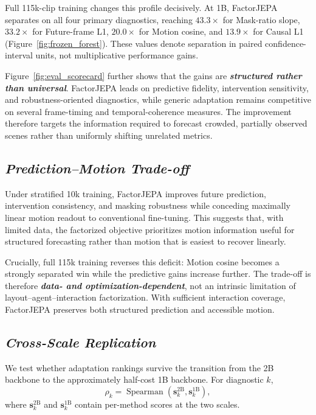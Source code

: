 Full 115k-clip training changes this profile decisively. At 1B, FactorJEPA
separates on all four primary diagnostics, reaching
\textbf{\emph{$43.3\times$}} for Mask-ratio slope,
\textbf{\emph{$33.2\times$}} for Future-frame L1,
\textbf{\emph{$20.0\times$}} for Motion cosine, and
\textbf{\emph{$13.9\times$}} for Causal L1
(Figure~\ref{fig:frozen_forest}). These values denote separation in paired
confidence-interval units, not multiplicative performance gains.

Figure~\ref{fig:eval_scorecard} further shows that the gains are
\textbf{\emph{structured rather than universal}}. FactorJEPA leads on
predictive fidelity, intervention sensitivity, and robustness-oriented
diagnostics, while generic adaptation remains competitive on several
frame-timing and temporal-coherence measures. The improvement therefore targets
the information required to forecast crowded, partially observed scenes rather
than uniformly shifting unrelated metrics.

\subsection{\textbf{\emph{Prediction--Motion Trade-off}}}

Under stratified 10k training, FactorJEPA improves future prediction,
intervention consistency, and masking robustness while conceding maximally
linear motion readout to conventional fine-tuning. This suggests that, with
limited data, the factorized objective prioritizes motion information useful
for structured forecasting rather than motion that is easiest to recover
linearly.

Crucially, full 115k training reverses this deficit: Motion cosine becomes a
strongly separated win while the predictive gains increase further. The
trade-off is therefore \textbf{\emph{data- and optimization-dependent}}, not an
intrinsic limitation of layout--agent--interaction factorization. With
sufficient interaction coverage, FactorJEPA preserves both structured
prediction and accessible motion.

\subsection{\textbf{\emph{Cross-Scale Replication}}}

We test whether adaptation rankings survive the transition from the 2B backbone
to the approximately half-cost 1B backbone. For diagnostic $k$,
\begin{equation*}
\rho_k
=
\operatorname{Spearman}
\left(
\mathbf s_k^{2\mathrm B},
\mathbf s_k^{1\mathrm B}
\right),
\end{equation*}
where $\mathbf s_k^{2\mathrm B}$ and $\mathbf s_k^{1\mathrm B}$ contain
per-method scores at the two scales.

